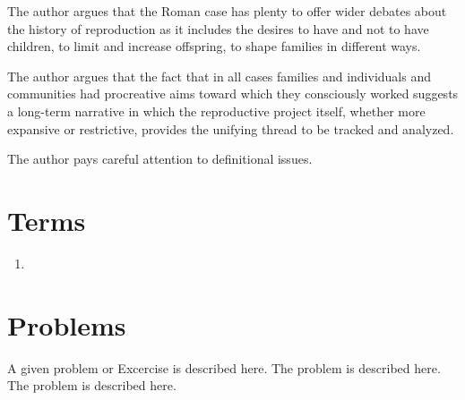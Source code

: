 The author argues that the Roman case has plenty to offer wider debates about the history of reproduction as it includes the desires to have and not to have children, to limit and increase offspring, to shape families in different ways.

The author argues that the fact that in all cases families and individuals and communities had procreative aims toward which they consciously worked suggests a long-term narrative in which the reproductive project itself, whether more expansive or restrictive, provides the unifying thread to be tracked and analyzed.

\begin{nte}
    The author pays careful attention to definitional issues.
\end{nte}



\section{Terms}
\label{sec:terms6}

\begin{enumerate}
	\item
\end{enumerate}

%
%
%


\section*{Problems}
%
\begin{prob}
\label{prob1}
A given problem or Excercise is described here. The
problem is described here. The problem is described here.
\end{prob}



